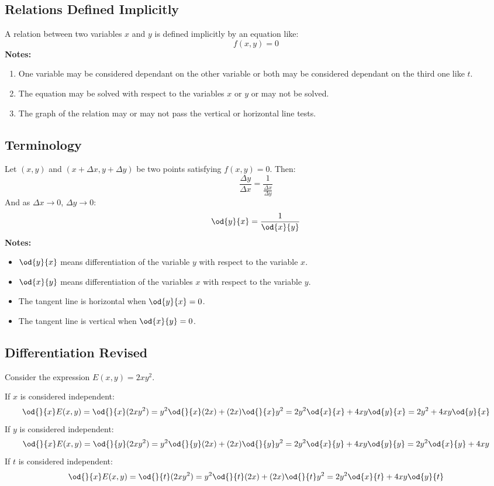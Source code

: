 \subsection{Relations Defined Implicitly}
	A relation between two variables $x$ and $y$ is defined implicitly by an equation like:
	\[f(x,y) = 0\]
	\textbf{Notes:}
	\begin{enumerate}
		\item One variable may be considered dependant on the other variable or both may be considered dependant on the third one like $t$.
		\item The equation may be solved with respect to the variables $x$ or $y$ or may not be solved.
		\item The graph of the relation may or may not pass the vertical or horizontal line tests.
	\end{enumerate}
\subsection{Terminology}
	Let $(x,y)$ and $(x + \Delta x, y + \Delta y)$ be two points satisfying $f(x,y) = 0$. Then:
	\[\frac{\Delta y}{\Delta x} = \frac{1}{\frac{\Delta x}{\Delta y}}\]
	And as $\Delta x \to 0$, $\Delta y \to 0$:
	\[\od{y}{x} = \frac{1}{\od{x}{y}}\]
	\textbf{Notes:}
	\begin{itemize}
		\item $\od{y}{x}$ means differentiation of the variable $y$ with respect to the variable $x$.
		\item $\od{x}{y}$ means differentiation of the variables $x$ with respect to the variable $y$.
		\item The tangent line is horizontal when $\od{y}{x} = 0$.
		\item The tangent line is vertical when $\od{x}{y} = 0$.
	\end{itemize}
\subsection{Differentiation Revised}
	Consider the expression $E(x,y) = 2xy^2$.

	If $x$ is considered independent:
	\[\od{}{x}E(x,y) = \od{}{x}(2xy^2) = y^2 \od{}{x}(2x) + (2x) \od{}{x}y^2 = 2y^2 \od{x}{x} + 4xy\od{y}{x} = 2y^2 + 4xy\od{y}{x}\]
	If $y$ is considered independent:
	\[\od{}{x}E(x,y) = \od{}{y}(2xy^2) = y^2 \od{}{y}(2x) + (2x) \od{}{y}y^2 = 2y^2 \od{x}{y} + 4xy\od{y}{y} = 2y^2\od{x}{y} + 4xy\]
	If $t$ is considered independent:
	\[\od{}{x}E(x,y) = \od{}{t}(2xy^2) = y^2 \od{}{t}(2x) + (2x) \od{}{t}y^2 = 2y^2 \od{x}{t} + 4xy\od{y}{t}\]
